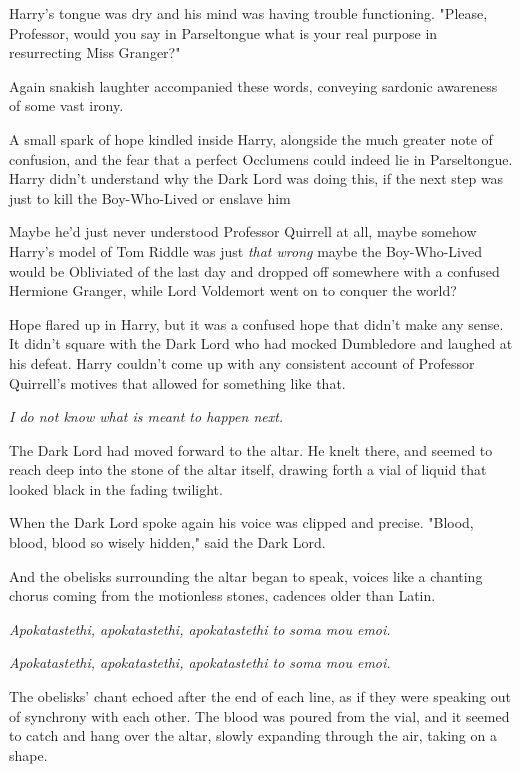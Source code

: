 Harry's tongue was dry and his mind was having trouble functioning. "Please,
Professor, would you say in Parseltongue what is your real purpose in
resurrecting Miss Granger?"

 Again snakish laughter
accompanied these words, conveying sardonic awareness of some vast irony.

A small spark of hope kindled inside Harry, alongside the much greater note of
confusion, and the fear that a perfect Occlumens could indeed lie in
Parseltongue. Harry didn't understand why the Dark Lord was doing this, if the
next step was just to kill the Boy-Who-Lived or enslave him{\el}

Maybe he'd just never understood Professor Quirrell at all, maybe somehow
Harry's model of Tom Riddle was just \emph{that wrong}{\el} maybe the
Boy-Who-Lived would be Obliviated of the last day and dropped off somewhere
with a confused Hermione Granger, while Lord Voldemort went on to conquer the
world\el?

Hope flared up in Harry, but it was a confused hope that didn't make any sense.
It didn't square with the Dark Lord who had mocked Dumbledore and laughed at
his defeat. Harry couldn't come up with any consistent account of Professor
Quirrell's motives that allowed for something like that.

\emph{I do not know what is meant to happen next.}

The Dark Lord had moved forward to the altar. He knelt there, and seemed to
reach deep into the stone of the altar itself, drawing forth a vial of liquid
that looked black in the fading twilight.

When the Dark Lord spoke again his voice was clipped and precise. "Blood,
blood, blood so wisely hidden," said the Dark Lord.

And the obelisks surrounding the altar began to speak, voices like a chanting
chorus coming from the motionless stones, cadences older than Latin.

\emph{Apokatastethi, apokatastethi, apokatastethi to soma mou emoi.}

\emph{Apokatastethi, apokatastethi, apokatastethi to soma mou emoi.}

The obelisks' chant echoed after the end of each line, as if they were speaking
out of synchrony with each other. The blood was poured from the vial, and it
seemed to catch and hang over the altar, slowly expanding through the air,
taking on a shape.

